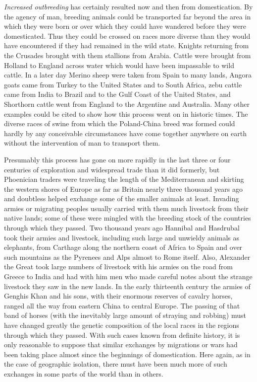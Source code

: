 \textit{Increased outbreeding} has certainly resulted now and then from domestication. By the agency of man, breeding 
animals could be transported far beyond the area in which they were born or over which they could have wandered before they 
were domesticated. Thus they could be crossed on races more diverse than they would have encountered if they had remained in 
the wild state. Knights returning from the Crusades brought with them stallions from Arabia. Cattle were brought from 
Holland to England across water which would have been impassable to wild cattle. In a later day Merino sheep were taken from 
Spain to many lands, Angora goats came from Turkey to the United States and to South Africa, zebu cattle came from India to 
Brazil and to the Gulf Coast of the United States, and Shorthorn cattle went from England to the Argentine and Australia. 
Many other examples could be cited to show how this process went on in historic times. The diverse races of swine from which 
the Poland-China breed was formed could hardly by any conceivable circumstances have come together anywhere on earth without 
the intervention of man to transport them. 

Presumably this process has gone on more rapidly in the last three or four centuries of exploration and widespread trade
than it did formerly, but Phoenician traders were traveling the length of the Mediterranean and skirting the western shores 
of Europe as far as Britain nearly three thousand years ago and doubtless helped exchange some of the smaller animals at 
least. Invading armies or migrating peoples usually carried with them much livestock from their native lands; some of these 
were mingled with the breeding stock of the countries through which they passed. Two thousand years ago Hannibal and 
Hasdrubal took their armies and livestock, including such large and unwieldy animals as elephants, from Carthage along the 
northern coast of Africa to Spain and over such mountains as the Pyrenees and Alps almost to Rome itself. Also, Alexander 
the Great took large numbers of livestock with his armies on the road from Greece to India and had with him men who made 
careful notes about the strange livestock they saw in the new lands. In the early thirteenth century the armies of Genghis 
Khan and his sons, with their enormous reserves of cavalry horses, ranged all the way from eastern China to central Europe. 
The passing of that band of horses (with the inevitably large amount of straying and robbing) must have changed greatly the 
genetic composition of the local races in the regions through which they passed. With such cases known from definite 
history, it is only reasonable to suppose that similar exchanges by migrations or wars had been taking place almost since 
the beginnings of domestication. Here again, as in the case of geographic isolation, there must have been much more of such 
exchanges in some parts of the world than in others. 

